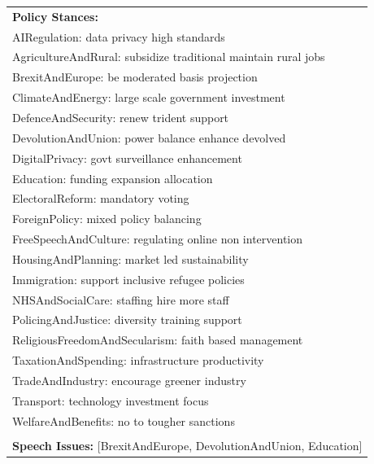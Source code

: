\documentclass[11pt]{article}
\begin{document}
\begin{table}[ht]
\begin{tabularx}{\textwidth}{X}
\textbf{Policy Stances:} \\
AIRegulation: data privacy high standards \\
AgricultureAndRural: subsidize traditional maintain rural jobs \\
BrexitAndEurope: be moderated basis projection \\
ClimateAndEnergy: large scale government investment \\
DefenceAndSecurity: renew trident support \\
DevolutionAndUnion: power balance enhance devolved \\
DigitalPrivacy: govt surveillance enhancement \\
Education: funding expansion allocation \\
ElectoralReform: mandatory voting \\
ForeignPolicy: mixed policy balancing \\
FreeSpeechAndCulture: regulating online non intervention \\
HousingAndPlanning: market led sustainability \\
Immigration: support inclusive refugee policies \\
NHSAndSocialCare: staffing hire more staff \\
PolicingAndJustice: diversity training support \\
ReligiousFreedomAndSecularism: faith based management \\
TaxationAndSpending: infrastructure productivity \\
TradeAndIndustry: encourage greener industry \\
Transport: technology investment focus \\
WelfareAndBenefits: no to tougher sanctions \\
\\[4pt]

\textbf{Speech Issues:} [BrexitAndEurope, DevolutionAndUnion, Education] \\[4pt]


\end{tabularx}
\end{table}
\end{document}
